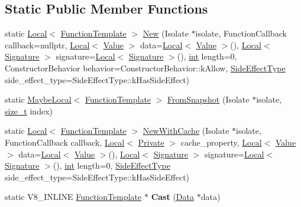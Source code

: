 \subsection*{Static Public Member Functions}
\begin{DoxyCompactItemize}
\item 
static \mbox{\hyperlink{classv8_1_1Local}{Local}}$<$ \mbox{\hyperlink{classv8_1_1FunctionTemplate}{Function\+Template}} $>$ \mbox{\hyperlink{classv8_1_1FunctionTemplate_a55e3cc6d55e3cb089c49c7616fcb39f5}{New}} (Isolate $\ast$isolate, Function\+Callback callback=nullptr, \mbox{\hyperlink{classv8_1_1Local}{Local}}$<$ \mbox{\hyperlink{classv8_1_1Value}{Value}} $>$ data=\mbox{\hyperlink{classv8_1_1Local}{Local}}$<$ \mbox{\hyperlink{classv8_1_1Value}{Value}} $>$(), \mbox{\hyperlink{classv8_1_1Local}{Local}}$<$ \mbox{\hyperlink{classv8_1_1Signature}{Signature}} $>$ signature=\mbox{\hyperlink{classv8_1_1Local}{Local}}$<$ \mbox{\hyperlink{classv8_1_1Signature}{Signature}} $>$(), \mbox{\hyperlink{classint}{int}} length=0, Constructor\+Behavior behavior=Constructor\+Behavior\+::k\+Allow, \mbox{\hyperlink{namespacev8_a29711319c2b9fc7716d65faee2f7b9cb}{Side\+Effect\+Type}} side\+\_\+effect\+\_\+type=Side\+Effect\+Type\+::k\+Has\+Side\+Effect)
\item 
static \mbox{\hyperlink{classv8_1_1MaybeLocal}{Maybe\+Local}}$<$ \mbox{\hyperlink{classv8_1_1FunctionTemplate}{Function\+Template}} $>$ \mbox{\hyperlink{classv8_1_1FunctionTemplate_ac2ac00c5547ff4d39c14f892c043e3ec}{From\+Snapshot}} (Isolate $\ast$isolate, \mbox{\hyperlink{classsize__t}{size\+\_\+t}} index)
\item 
static \mbox{\hyperlink{classv8_1_1Local}{Local}}$<$ \mbox{\hyperlink{classv8_1_1FunctionTemplate}{Function\+Template}} $>$ \mbox{\hyperlink{classv8_1_1FunctionTemplate_a2f623ce4c7b190d1eb8c3d53b546609d}{New\+With\+Cache}} (Isolate $\ast$isolate, Function\+Callback callback, \mbox{\hyperlink{classv8_1_1Local}{Local}}$<$ \mbox{\hyperlink{classv8_1_1Private}{Private}} $>$ cache\+\_\+property, \mbox{\hyperlink{classv8_1_1Local}{Local}}$<$ \mbox{\hyperlink{classv8_1_1Value}{Value}} $>$ data=\mbox{\hyperlink{classv8_1_1Local}{Local}}$<$ \mbox{\hyperlink{classv8_1_1Value}{Value}} $>$(), \mbox{\hyperlink{classv8_1_1Local}{Local}}$<$ \mbox{\hyperlink{classv8_1_1Signature}{Signature}} $>$ signature=\mbox{\hyperlink{classv8_1_1Local}{Local}}$<$ \mbox{\hyperlink{classv8_1_1Signature}{Signature}} $>$(), \mbox{\hyperlink{classint}{int}} length=0, \mbox{\hyperlink{namespacev8_a29711319c2b9fc7716d65faee2f7b9cb}{Side\+Effect\+Type}} side\+\_\+effect\+\_\+type=Side\+Effect\+Type\+::k\+Has\+Side\+Effect)
\item 
\mbox{\label{classv8_1_1FunctionTemplate_abd44ba8482fceb30ffa3d2f8863fac1e}} 
static V8\+\_\+\+I\+N\+L\+I\+NE \mbox{\hyperlink{classv8_1_1FunctionTemplate}{Function\+Template}} $\ast$ {\bfseries Cast} (\mbox{\hyperlink{classv8_1_1Data}{Data}} $\ast$data)
\end{DoxyCompactItemize}
